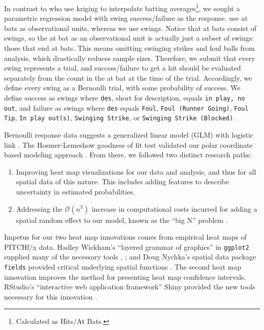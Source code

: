 In contrast to \cite{Cross2015} who use kriging to interpolate batting averages\footnote{Calculated as Hits/At Bats.}, we sought a parametric regression model with swing success/failure as the response. \cite{Cross2015} use at bats as observational units, whereas we use swings. Notice that at bats consist of swings, so the at bat as an observational unit is actually just a subset of swings: those that end at bats. This means omitting swinging strikes and foul balls from analysis, which drastically reduces sample sizes. Therefore, we submit that every swing represents a trial, and success/failure to get a hit should be evaluated separately from the count in the at bat at the time of the trial. Accordingly, we define every swing as a Bernoulli trial, with some probability of success. We define success as swings where \verb|des|, short for description, equals \verb|in play, no out|, and failure as swings where \verb|des| equals \verb|Foul|, \verb|Foul (Runner Going)|, \verb|Foul Tip|, \verb|In play out(s)|, \verb|Swinging Strike|, or \verb|Swinging Strike (Blocked)|.

Bernoulli response data suggests a generalized linear model (GLM) with logistic link \citep{Myers2012}. The Hosmer-Lemeshow goodness of fit test validated our polar coordinate based modeling approach \citep{Hosmer2013}. From there, we followed two distinct research paths:
\begin{enumerate}
\item Improving heat map visualizations for our data and analysis, and thus for all spatial data of this nature. This includes adding features to describe uncertainty in estimated probabilities.
\item Addressing the $\mathcal{O}(n^{3})$ increase in computational costs incurred for adding a spatial random effect to our model, known as the ``big N'' problem \citep{Finley2009}. 
\end{enumerate}
Impetus for our two heat map innovations comes from empirical heat maps of PITCHf/x\textsuperscript{\textregistered} data. Hadley Wickham's ``layered grammar of graphics'' in \verb|ggplot2| supplied many of the necessary tools \citep{Wickham2009}, \citep{Wickham2010}; and Doug Nychka's spatial data package \verb|fields| provided critical underlying spatial functions \citep{Nychka}. The second heat map innovation improves the method for presenting heat map confidence intervals. RStudio's ``interactive web application framework'' Shiny provided the new tools necessary for this innovation \citep{Shiny}.

